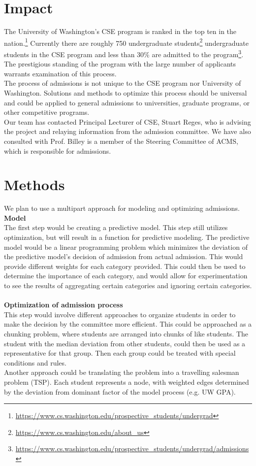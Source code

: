 \documentclass[11pt]{article}
\begin{document}
\section{Impact}

The University of Washington's CSE program is ranked in the top ten in the nation.\footnote{\url{https://www.cs.washington.edu/prospective_students/undergrad}} Currently there are roughly 750 undergraduate students\footnote{\url{https://www.cs.washington.edu/about_us}} undergraduate students in the CSE program and less than 30\% are admitted to the program\footnote{\url{https://www.cs.washington.edu/prospective_students/undergrad/admissions}}. The prestigious standing of the program with the large number of applicants warrants examination of this process.
\\
\indent The process of admissions is not unique to the CSE program nor University of Washington. Solutions and methods to optimize this process should be universal and could be applied to general admissions to universities, graduate programs, or other competitive programs.
\\
\indent Our team has contacted Principal Lecturer of CSE, Stuart Reges, who is advising the project and relaying information from the admission committee. We have also consulted with Prof. Billey is a member of the Steering Committee of ACMS, which is responsible for admissions.

\section{Methods}

We plan to use a multipart approach for modeling and optimizing admissions. 
\\
\textbf {Model}
\\
The first step would be creating a predictive model. This step still utilizes optimization, but will result in a function for predictive modeling. The predictive model would be a linear programming problem which minimizes the deviation of the predictive model's decision of admission from actual admission. This would provide different weights for each category provided. This could then be used to determine the importance of each category, and would allow for experimentation to see the results of aggregating certain categories and ignoring certain categories.
\\\\
\textbf {Optimization of admission process}
\\
This step would involve different approaches to organize students in order to make the decision by the committee more efficient. This could be approached as a chunking problem, where students are arranged into chunks of like students. The student with the median deviation from other students, could then be used as a representative for that group. Then each group could be treated with special conditions and rules.
\\ \indent Another approach could be translating the problem into a travelling salesman problem (TSP). Each student represents a node, with weighted edges determined by the deviation from dominant factor of the model process (e.g. UW GPA).
\end{document}
